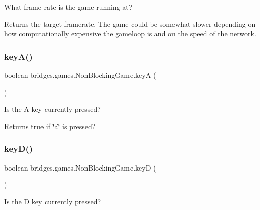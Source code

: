 What frame rate is the game running at? 

\begin{DoxyReturn}{Returns}
the target framerate. The game could be somewhat slower depending on how computationally expensive the gameloop is and on the speed of the network. 
\end{DoxyReturn}
\mbox{\label{classbridges_1_1games_1_1_non_blocking_game_a4328a21ca65c26e11161dfe362770917}} 
\subsubsection{\texorpdfstring{key\+A()}{keyA()}}
{\footnotesize\ttfamily boolean bridges.\+games.\+Non\+Blocking\+Game.\+keyA (\begin{DoxyParamCaption}{ }\end{DoxyParamCaption})\hspace{0.3cm}{\ttfamily [protected]}}



Is the A key currently pressed? 

\begin{DoxyReturn}{Returns}
true if \char`\"{}a\char`\"{} is pressed? 
\end{DoxyReturn}
\mbox{\label{classbridges_1_1games_1_1_non_blocking_game_a830a2e8127b042f8915deb61f0038f2a}} 
\subsubsection{\texorpdfstring{key\+D()}{keyD()}}
{\footnotesize\ttfamily boolean bridges.\+games.\+Non\+Blocking\+Game.\+keyD (\begin{DoxyParamCaption}{ }\end{DoxyParamCaption})\hspace{0.3cm}{\ttfamily [protected]}}



Is the D key currently pressed? 

